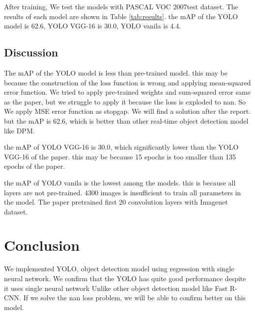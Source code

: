 \documentclass[extendedabs]{bmvc2k}
\begin{document}
After training, We test the models with PASCAL VOC 2007test dataset. The results of each model are shown in Table \ref{tab:results}. the mAP of the YOLO model is 62.6, YOLO VGG-16 is 30.0, YOLO vanila is 4.4.

\subsection{Discussion}
The mAP of the YOLO model is less than pre-trained model. this may be because the construction of the loss function is wrong and applying mean-squared error function. We tried to apply pre-trained weights and sum-squared error same as the paper\cite{yolopaper}, but we struggle to apply it because the loss is exploded to nan. So We apply MSE error function as stopgap. We will find a solution after the report. but the mAP is 62.6, which is better than other real-time object detection model like DPM\cite{dpm}.

the mAP of YOLO VGG-16 is 30.0, which significantly lower than the YOLO VGG-16 of the paper\cite{yolopaper}. this may be because 15 epochs is too smaller than 135 epochs of the paper\cite{yolopaper}.

the mAP of YOLO vanila is the lowest among the models. this is because all layers are not pre-trained. 4300 images is insufficient to train all parameters in the model. The paper\cite{yolopaper} pretrained first 20 convolution layers with Imagenet dataset. 

\section{Conclusion}
We implemented YOLO, object detection model using regression with single neural network. We confirm that the YOLO has quite good performance despite it uses single neural network Unlike other object detection model like Fast R-CNN\cite{fastrcnn}. If we solve the nan loss problem, we will be able to confirm better on this model.

\newpage

\end{document}
